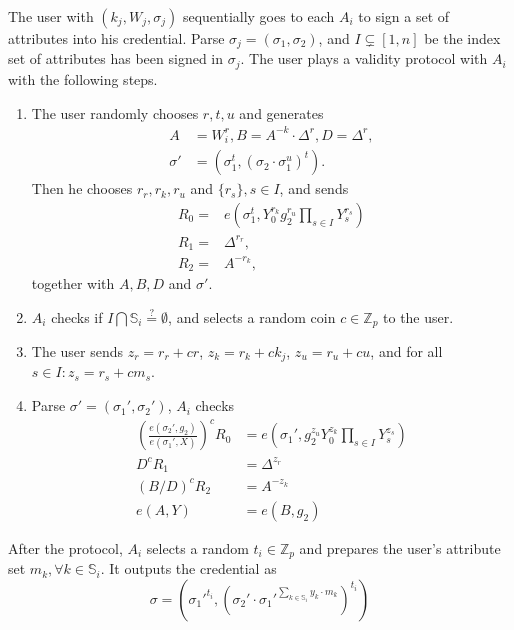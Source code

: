 \documentclass[journal]{IEEEtran}
\begin{document}
	The user with $(k_j, W_j, \sigma_j)$ sequentially goes to each $A_i$ to sign a set of attributes into his credential. Parse $\sigma_j = (\sigma_1, \sigma_2)$, and $I\subsetneq [1, n]$ be the index set of attributes has been signed in $\sigma_j$. The user plays a validity protocol with $A_i$ with the following steps.
	\begin{enumerate}
		\item The user randomly chooses $r, t, u$ and generates 
		\begin{align}\label{eq:blindcred}
		A &= W_i^r, B = A^{-k}\cdot \Delta^r, D =\Delta^r,\\ 
		\sigma' &= (\sigma_1^t,(\sigma_2\cdot \sigma_1^u)^t).\nonumber
		\end{align} 
		Then he chooses $r_r, r_k, r_u$ and $\{r_s\}, s\in I$, 
		and sends 
		\begin{align}
		R_0 =& e(\sigma_1^t, Y_0^{r_k}g_2^{r_u}\prod_{s \in I} Y_s^{r_s}) \\
		R_1 =& \Delta^{r_r},\\
		R_2 =& A ^{-r_k},
		\end{align}
		together with $A, B, D$ and $\sigma'$.
		\item $A_i$ checks if $I\bigcap \mathbb{S}_i \overset{?}{=} \emptyset$, and selects a random coin $c\in \mathbb{Z}_p$ to the user.
		\item The user sends $z_r = r_r + cr$, $z_k = r_k + ck_j$, $z_u = r_u + cu$, and for all $s\in I: z_s = r_s + c m_s$. 
		\item Parse $\sigma' = (\sigma_1', \sigma_2')$, $A_i$ checks 
		\begin{align}
		(\frac{e(\sigma_2', g_2)}{e(\sigma_1', X)})^c R_0 & = e(\sigma_1', g_2^{z_u}Y_0^{z_k}\prod_{s \in I}Y_s^{z_s})\\
		D^c R_1 & = \Delta^{z_r} \\
		(B/D)^c R_2 & = A^{-z_k} \\
		e(A, Y) &= e(B, g_2) 
		\end{align}
	\end{enumerate}

After the protocol, $A_i$ selects a random $t_i\in\mathbb{Z}_p$ and prepares the user's attribute set $m_k, \forall k\in \mathbb{S}_i$. It outputs the credential as 
$$\sigma = (\sigma_1'^{t_i}, (\sigma_2'\cdot \sigma_1'^{\sum_{k\in\mathbb{S}_i }y_k \cdot m_k})^{t_i})$$
\end{document}
